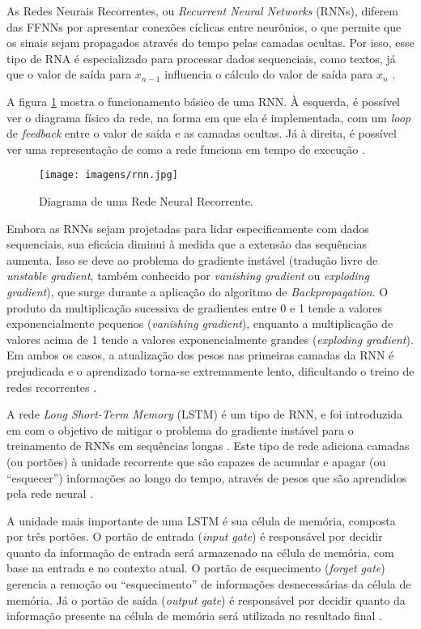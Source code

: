 \documentclass[
	12pt, oneside, a4paper, english, brazil
]{abntex2ppgsi}
\begin{document}
As Redes Neurais Recorrentes, ou {\em Recurrent Neural Networks} (RNNs), diferem das FFNNs por apresentar conexões cíclicas entre neurônios, o que permite que os sinais sejam propagados através do tempo pelas camadas ocultas. Por isso, esse tipo de RNA é especializado para processar dados sequenciais, como textos, já que o valor de saída para $x_{n-1}$ influencia o cálculo do valor de saída para $x_n$ \cite{nielsen2015}.

A figura \ref{fig:rnn} mostra o funcionamento básico de uma RNN. À esquerda, é possível ver o diagrama físico da rede, na forma em que ela é implementada, com um {\em loop} de {\em feedback} entre o valor de saída e as camadas ocultas. Já à direita, é possível ver uma representação de como a rede funciona em tempo de execução \cite{pln2023}.

\begin{figure}[H]
	\centering
 	  \caption{Diagrama de uma Rede Neural Recorrente.}
	\texttt{[image: imagens/rnn.jpg]}
	\label{fig:rnn}
\end{figure}

Embora as RNNs sejam projetadas para lidar especificamente com dados sequenciais, sua eficácia diminui à medida que a extensão das sequências aumenta. Isso se deve ao problema do gradiente instável (tradução livre de {\em unstable gradient}, também conhecido por {\em vanishing gradient} ou {\em exploding gradient}), que surge durante a aplicação do algoritmo de {\em Backpropagation}. O produto da multiplicação sucessiva de gradientes entre 0 e 1 tende a valores exponencialmente pequenos ({\em vanishing gradient}), enquanto a multiplicação de valores acima de 1 tende a valores exponencialmente grandes ({\em exploding gradient}). Em ambos os casos, a atualização dos pesos nas primeiras camadas da RNN é prejudicada e o aprendizado torna-se extremamente lento, dificultando o treino de redes recorrentes \cite{nielsen2015}.

A rede {\em Long Short-Term Memory} (LSTM) é um tipo de RNN, e foi introduzida em  com o objetivo de mitigar o problema do gradiente instável para o treinamento de RNNs em sequências longas \cite{pln2023}. Este tipo de rede adiciona camadas (ou portões) à unidade recorrente que são capazes de acumular e apagar (ou ``esquecer'') informações ao longo do tempo, através de pesos que são aprendidos pela rede neural \cite{goodfellow2016}.

A unidade mais importante de uma LSTM é sua célula de memória, composta por três portões. O portão de entrada ({\em input gate}) é responsável por decidir quanto da informação de entrada será armazenado na célula de memória, com base na entrada e no contexto atual. O portão de esquecimento ({\em forget gate}) gerencia a remoção ou ``esquecimento'' de informações desnecessárias da célula de memória. Já o portão de saída ({\em output gate}) é responsável por decidir quanto da informação presente na célula de memória será utilizada no resultado final \cite{lstmforget2000}.
\end{document}
